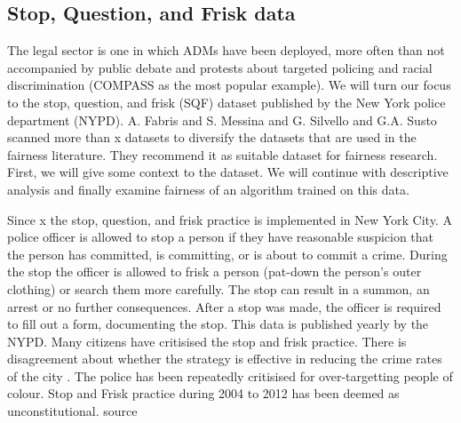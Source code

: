\subsection*{Stop, Question, and Frisk data}

The legal sector is one in which ADMs have been deployed, more often than not accompanied by public debate and protests about targeted policing and racial discrimination (COMPASS as the most popular example). We will turn our focus to the stop, question, and frisk (SQF) dataset published by the New York police department (NYPD). A. Fabris and S. Messina and G. Silvello and G.A. Susto scanned more than x datasets to diversify the datasets that are used in the fairness literature. They recommend it as suitable dataset for fairness research. First, we will give some context to the dataset. We will continue with descriptive analysis and finally examine fairness of an algorithm trained on this data.

Since x the stop, question, and frisk practice is implemented in New York City. A police officer is allowed to stop a person if they have reasonable suspicion that the person has committed, is committing, or is about to commit a crime.
During the stop the officer is allowed to frisk a person (pat-down the person's outer clothing) or search them more carefully.
The stop can result in a summon, an arrest or no further consequences. After a stop was made, the officer is required to fill out a form, documenting the stop. This data is published yearly by the NYPD.
Many citizens have critisised the stop and frisk practice. There is disagreement about whether the strategy is effective in reducing the crime rates of the city \color{red}{cite some studies}. The police has been repeatedly critisised for over-targetting people of colour.
Stop and Frisk practice during 2004 to 2012 has been deemed as unconstitutional. {\color{red} source}

